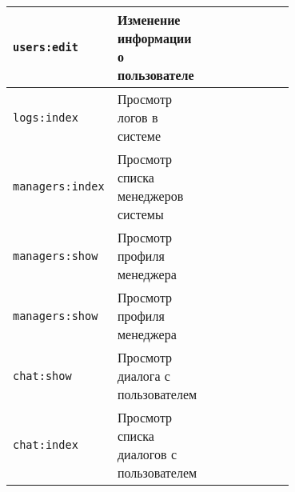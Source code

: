 \begin{center}
\begin{longtable}{|p{0.2\linewidth}|p{0.2\linewidth}|p{0.05\linewidth}|p{0.05\linewidth}|p{0.05\linewidth}|p{0.05\linewidth}|p{0.05\linewidth}|p{0.05\linewidth}|}
\texttt{users:edit} & Изменение информации о пользователе & {\color{green}{ДА}} &  {\color{red}{НЕТ}} &  {\color{red}{НЕТ}} &  {\color{red}{НЕТ}} & {\color{red}{НЕТ}} &  {\color{red}{НЕТ}} \\ \hline

\texttt{logs:index} & Просмотр логов в системе & {\color{green}{ДА}} &  {\color{red}{НЕТ}} &  {\color{red}{НЕТ}} &  {\color{red}{НЕТ}} & {\color{red}{НЕТ}} &  {\color{red}{НЕТ}} \\ \hline

\texttt{managers:index} & Просмотр списка менеджеров системы &  {\color{red}{НЕТ}} &  {\color{green}{ДА}} &  {\color{red}{НЕТ}} &  {\color{red}{НЕТ}} & {\color{red}{НЕТ}} &  {\color{red}{НЕТ}} \\ \hline

\texttt{managers:show} & Просмотр профиля менеджера &  {\color{red}{НЕТ}} &  {\color{green}{ДА}} &  {\color{red}{НЕТ}} &  {\color{red}{НЕТ}} & {\color{red}{НЕТ}} &  {\color{red}{НЕТ}} \\ \hline

\texttt{managers:show} & Просмотр профиля менеджера &  {\color{red}{НЕТ}} &  {\color{green}{ДА}} &  {\color{red}{НЕТ}} &  {\color{red}{НЕТ}} & {\color{red}{НЕТ}} &  {\color{red}{НЕТ}} \\ \hline

\texttt{chat:show} & Просмотр диалога с пользователем &  {\color{red}{НЕТ}} &   {\color{red}{НЕТ}} &  {\color{red}{НЕТ}} &  {\color{red}{НЕТ}} & {\color{green}{ДА}} &  {\color{red}{НЕТ}} \\ \hline

\texttt{chat:index} & Просмотр списка диалогов с пользователем &  {\color{red}{НЕТ}} &   {\color{red}{НЕТ}} &  {\color{red}{НЕТ}} &  {\color{red}{НЕТ}} & {\color{green}{ДА}} &  {\color{red}{НЕТ}} \\ \hline


\end{longtable}
\end{center}